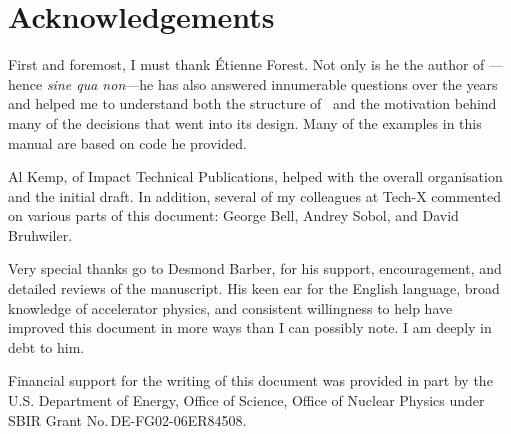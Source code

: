 
\chapter{Acknowledgements}

First and foremost, I must thank \'Etienne Forest. Not only is he
the author of \PTC---hence \emph{sine qua non}---he has also answered
innumerable questions over the years and helped me to understand both
the structure of \PTC\ and the motivation behind many of the decisions
that went into its design. Many of the examples in this manual are
based on code he provided.

Al Kemp, of Impact Technical Publications, helped with the overall
organisation and the initial draft. In addition, several of my
colleagues at Tech-X commented on various parts of this document:
George Bell, Andrey Sobol, and David Bruhwiler.

Very special thanks go to Desmond Barber, for his support,
encouragement, and detailed reviews of the manuscript. His keen ear
for the English language, broad knowledge of accelerator physics,
and consistent willingness to help have improved this document in
more ways than I can possibly note. I am deeply in debt to him.

Financial support for the writing of this document was provided in
part by the U.S. Department of Energy, Office of Science, Office of
Nuclear Physics under SBIR Grant No.\,DE-FG02-06ER84508.


\endinput
